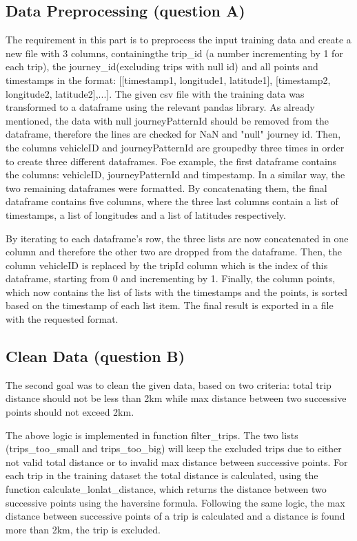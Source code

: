 \documentclass[12pt]{article}
\begin{document}
	\subsection{Data Preprocessing (question A)}
	The requirement in this part is to preprocess the input training data and create a new file with 3 columns, containingthe trip\_id (a number incrementing by 1 for each trip), the journey\_id(excluding trips with null id) and all points and timestamps in the format: [[timestamp1, longitude1, latitude1], [timestamp2, longitude2, latitude2],...]. The given csv file with the training data was transformed to a dataframe using the relevant pandas library. As already mentioned, the data with null journeyPatternId should be removed from the dataframe, therefore the lines are checked for NaN and "null" journey id. Then, the columns vehicleID and journeyPatternId are groupedby three times in order to create three different dataframes. Foe example, the first dataframe contains the columns: vehicleID, journeyPatternId and timpestamp. In a similar way, the two remaining dataframes were formatted. By concatenating them, the final dataframe contains five columns, where the three last columns contain a list of timestamps, a list of longitudes and a list of latitudes respectively.
	
	By iterating to each dataframe's row, the three lists are now concatenated in one column and therefore the other two are dropped from the dataframe. Then, the column vehicleID is replaced by the tripId column which is the index of this dataframe, starting from 0 and incrementing by 1. Finally, the column points, which now contains the list of lists with the timestamps and the points, is sorted based on the timestamp of each list item. The final result is exported in a file with the requested format.
	
	\subsection{Clean Data (question B)}
	The second goal was to clean the given data, based on two criteria: total trip distance should not be less than 2km while max distance between two successive points should not exceed 2km.
	
	The above logic is implemented in function filter\_trips. The two lists (trips\_too\_small and trips\_too\_big) will keep the excluded trips due to either not valid total distance or to invalid max distance between successive points. For each trip in the training dataset the total distance is calculated, using the function calculate\_lonlat\_distance, which returns the distance between two successive points using the haversine formula. Following the same logic, the max distance between successive points of a trip is calculated and a distance is found more than 2km, the trip is excluded.
	
\end{document}

